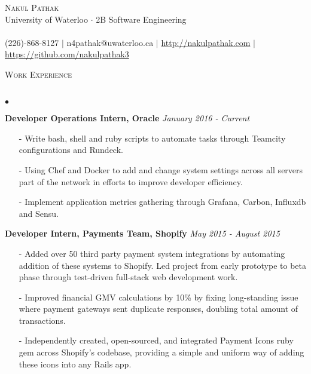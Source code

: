 \documentclass[10pt]{article}
\newcommand{\lineunder}{\vspace*{-8pt} \\ \hspace*{-18pt} \hrulefill \\}
\newcommand{\header}[1]{{\hspace*{-15pt}\vspace*{6pt} \textsc{#1}} \vspace*{-6pt} \lineunder }
\newenvironment{achievements}{\begin{list}{$\bullet$}{\topsep 0pt \itemsep -1.5pt \leftmargin 5pt}}{\vspace*{4pt}\end{list}}
\begin{document}
\small
\smallskip
\vspace*{-45pt}

\begin{center}
	{\Huge \scshape {Nakul Pathak}} \\
	\vspace*{6pt} 
{\fontsize{10}{1}\selectfont University of Waterloo $\cdot$ 2B Software Engineering} \\
\vspace{-4pt}
\hspace*{-18pt} \hrulefill \\
\vspace{2pt}
\hspace*{-18pt} (226)-868-8127 $|$ n4pathak@uwaterloo.ca $|$ \url{http://nakulpathak.com} $|$  \url{https://github.com/nakulpathak3}
\vspace{-5pt}
\end{center}

\vspace{8pt}

\header{\fontsize{11}{12}\selectfont  Work Experience}
\begin{achievements}
\item \textbf{Developer Operations Intern, Oracle} \hfill \textit {January 2016 - Current}
\begin{itemize}
\item[-]Write bash, shell and ruby scripts to automate tasks through Teamcity configurations and Rundeck.
\vspace{2pt}
\item[-]Using Chef and Docker to add and change system settings across all servers part of the network in efforts to improve developer efficiency.
\vspace{2pt}
\item[-]Implement application metrics gathering through Grafana, Carbon, Influxdb and Sensu.
\end{itemize}
\vspace{2pt}
\item \textbf{Developer Intern, Payments Team, Shopify} \hfill \textit {May 2015 - August 2015}
\begin{itemize}
\item[-]Added over 50 third party payment system integrations by automating addition of these systems to Shopify. Led project from early prototype to beta phase through test-driven full-stack web development work.
\vspace{2pt}
\item[-]Improved financial GMV calculations by 10\% by fixing long-standing issue where payment gateways sent duplicate responses, doubling total amount of transactions. 
\vspace{2pt}
\item[-]Independently created, open-sourced, and integrated Payment Icons ruby gem across Shopify's codebase, providing a simple and uniform way of adding these icons into any Rails app.
\end{itemize}
\end{achievements}
\end{document}
